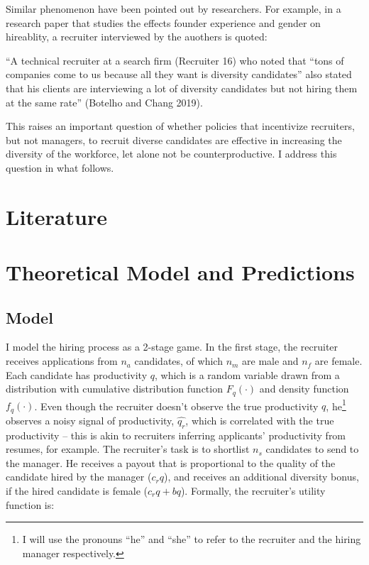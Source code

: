 \documentclass[11pt]{article}
\begin{document}
Similar phenomenon have been pointed out by researchers. For example, in a research paper that studies the effects founder experience and gender on hireablity, a recruiter interviewed by the auothers is quoted:

“A technical recruiter at a search firm (Recruiter 16) who noted that “tons of companies come to us because all they want is diversity candidates” also stated that his clients are interviewing a lot of diversity candidates but not hiring them at the same rate” (Botelho and Chang 2019).

This raises an important question of whether policies that incentivize recruiters, but not managers, to recruit diverse candidates are effective in increasing the diversity of the workforce, let alone not be counterproductive. I address this question in what follows.

\section{Literature}


\section{Theoretical Model and Predictions}

\subsection{Model}

I model the hiring process as a 2-stage game.
In the first stage, the recruiter receives applications from $n_a$ candidates, of which $n_m$ are male and $n_f$ are female. Each candidate has productivity $q$, which is a random variable drawn from a distribution with cumulative distribution function $F_q(\cdot)$ and density function $f_q(\cdot)$. Even though the recruiter doesn't observe the true productivity $q$, he\footnote{I will use the pronouns ``he'' and ``she'' to refer to the recruiter and the hiring manager respectively.} observes a noisy signal of productivity, $\hat{q_r}$, which is correlated with the true productivity -- this is akin to recruiters inferring applicants' productivity from resumes, for example.
The recruiter's task is to shortlist $n_s$ candidates to send to the manager. He receives a payout that is proportional to the quality of the candidate hired by the manager ($c_rq$), and receives an additional diversity bonus, if the hired candidate is female ($c_rq + bq$). Formally, the recruiter's utility function is:
\end{document}
